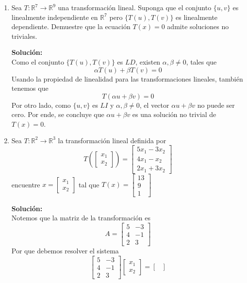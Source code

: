 \documentclass[12pt]{article}
\newenvironment{solucion}
{\begin{mdframed}[backgroundcolor=black!10]
		{\bf Solución:}\\
	}
	{
	\end{mdframed}
}
\newenvironment{preguntas}
{\begin{enumerate}\itemsep12pt
	}
	{
	\end{enumerate}
}
\newcommand{\ra}{\rightarrow}
\newcommand{\R}{\mathbb{R}}
\begin{document}
\begin{preguntas}
\begin{solucion}
\end{solucion}
\item Sea $T: \R^7 \ra \R^9$ una transformación lineal. Suponga que el conjunto $\{u,v\}$ es linealmente independiente en $\R^7$ pero $\{T(u), T(v)\}$ es linealmente dependiente. Demuestre que la ecuación $T(x)=0$ admite soluciones no triviales.
\begin{solucion}
Como el conjunto $\{T(u), T(v)\}$ es $LD$, existen $\alpha, \beta \neq 0$, tales que 
$$\alpha T(u) + \beta T(v) = 0$$
Usando la propiedad de linealidad para las transformaciones lineales, también tenemos que
$$ T(\alpha u +\beta v) = 0$$
Por otro lado, como $\{u, v\}$ es $LI$ y $\alpha, \beta \neq 0$, el vector $\alpha u +\beta v$ no puede ser cero. Por ende, se concluye que $\alpha u +\beta v$ es una solución no trivial de $T(x) = 0$.
\end{solucion}
\item Sea $T: \R^2 \ra \R^3$ la transformación lineal definida por
	$$ T\left(\begin{bmatrix}
	x_1\\
	x_2
	\end{bmatrix}\right) = \begin{bmatrix}
	5x_1 - 3x_2\\
	4x_1 -x_2\\
	2x_1 +3x_2
	\end{bmatrix}$$
	encuentre $x = \begin{bmatrix}
	x_1\\
	x_2
	\end{bmatrix}$ tal que $T(x) = \begin{bmatrix}
	13\\
	9\\
	1
	\end{bmatrix}$
\begin{solucion}
Notemos que la matriz de la transformación es
		$$ A = \begin{bmatrix}
		5 &- 3\\
		4& -1\\
		2& 3
		\end{bmatrix}$$
		Por que debemos resolver el sistema
		$$ \begin{bmatrix}
		5 &- 3\\
		4& -1\\
		2& 3
		\end{bmatrix}\begin{bmatrix}
		x_1\\
		x_2
		\end{bmatrix} = \begin{bmatrix}

\end{bmatrix}$$
\end{solucion}
\end{preguntas}
\end{document}
